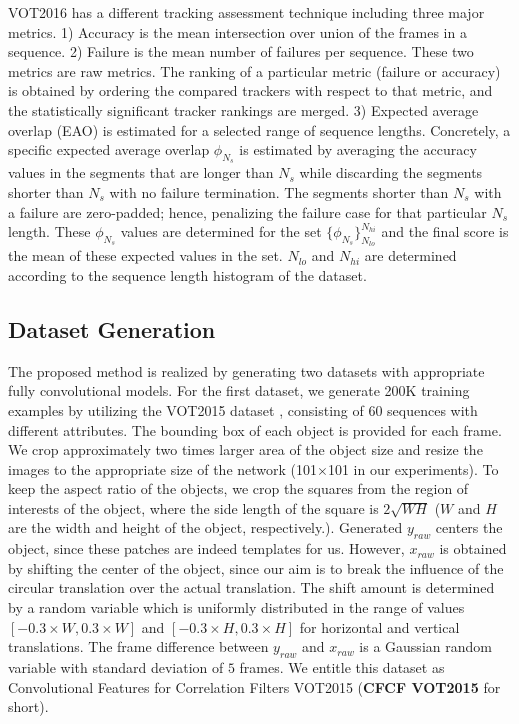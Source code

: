 \documentclass[journal]{IEEEtran}
\begin{document}
VOT2016 has a different tracking assessment technique including three major metrics. 1) Accuracy is the mean intersection over union of the frames in a sequence. 2) Failure is the mean number of failures per sequence. These two metrics are raw metrics. The ranking of a particular metric (failure or accuracy) is obtained by ordering the compared trackers with respect to that metric, and the statistically significant tracker rankings are merged. 3) Expected average overlap (EAO) is estimated for a selected range of sequence lengths. Concretely, a specific expected average overlap $\phi_{N_s}$ is estimated by averaging the accuracy values in the segments that are longer than $N_s$ while discarding the segments shorter than $N_s$ with no failure termination. The segments shorter than $N_s$ with a failure are zero-padded; hence, penalizing the failure case for that particular $N_s$ length. These $\phi_{N_s}$ values are determined for the set $\{\phi_{N_s}\}_{N_{lo}}^{N_{hi}}$ and the final score is the mean of these expected values in the set. $N_{lo}$ and $N_{hi}$ are determined according to the sequence length histogram of the dataset.

\subsection{Dataset Generation}
The proposed method is realized by generating two datasets with appropriate fully convolutional models. For the first dataset,
we generate 200K training examples by utilizing the VOT2015 dataset \cite{VOT2015}, consisting of 60 sequences with different attributes. The bounding box of each object is provided for each frame. We crop approximately two times larger area of the object size and resize the images to the appropriate size of the network (101$\times$101 in our experiments). To keep the aspect ratio of the objects, we crop the squares from the region of interests of the object, where the side length of the square is $2\sqrt{W H}$ ($W$ and $H$ are the width and height of the object, respectively.). Generated $y_{raw}$ centers the object, since these patches are indeed templates for us. However, $x_{raw}$ is obtained by shifting the center of the object, since our aim is to break the influence of the circular translation over the actual translation. The shift amount is determined by a random variable which is uniformly distributed in the range of values $[-0.3\times W, 0.3\times W]$ and $[-0.3\times H, 0.3\times H]$ for horizontal and vertical translations. The frame difference between $y_{raw}$ and $x_{raw}$ is a Gaussian random variable with standard deviation of $5$ frames. We entitle this dataset as Convolutional Features for Correlation Filters VOT2015 (\textbf{CFCF VOT2015} for short). 
\end{document}
